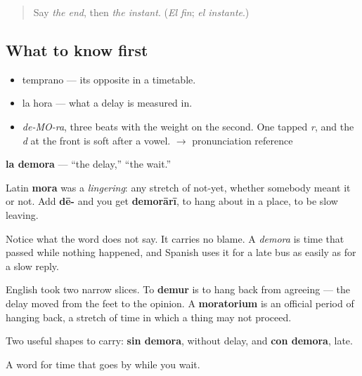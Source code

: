 \label{lesson:ES-C348-demora}



\begin{quote}
Say \emph{the end}, then \emph{the instant}. (\emph{El fin}; \emph{el instante}.)
\end{quote}

\subsection*{What to know first}
\begin{itemize}
\raggedright
  \item temprano — its opposite in a timetable.
  \item la hora — what a delay is measured in.
\end{itemize}

\begin{sounds}
\begin{itemize}
\raggedright
  \item \emph{de-MO-ra}, three beats with the weight on the second. One tapped \emph{r}, and the \emph{d} at the front is soft after a vowel. $\to$ pronunciation reference
\end{itemize}
\end{sounds}

\begin{cousinweb}
\textbf{la demora} — \textquotedblleft{}the delay,\textquotedblright{} \textquotedblleft{}the wait.\textquotedblright{}

Latin \textbf{mora} was a \emph{lingering}: any stretch of not-yet, whether somebody meant it or not. Add \textbf{dē-} and you get \textbf{demorārī}, to hang about in a place, to be slow leaving.

Notice what the word does not say. It carries no blame. A \emph{demora} is time that passed while nothing happened, and Spanish uses it for a late bus as easily as for a slow reply.

English took two narrow slices. To \textbf{demur} is to hang back from agreeing — the delay moved from the feet to the opinion. A \textbf{moratorium} is an official period of hanging back, a stretch of time in which a thing may not proceed.

Two useful shapes to carry: \textbf{sin demora}, without delay, and \textbf{con demora}, late.
\end{cousinweb}

\begin{grammarlens}[title={What you've built}]
A word for time that goes by while you wait.
\end{grammarlens}


